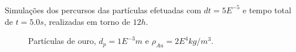 \documentclass{beamer}
\begin{document}
\begin{frame}
  \frametitle{\subsecname}
  \centering
  \begin{minipage}{.48\textwidth}
    \begin{block}{}
    \footnotesize
      Simulações dos percursos das partículas efetuadas com $dt=5E^{-5}$ e tempo total de $t=5.0s$, realizadas em torno de $12h$.
    \end{block}
  \end{minipage}
  \hfill
  \begin{minipage}{.48\textwidth}
    \begin{figure}
       {\raggedleft \tiny Partículas de ouro, $d_p=1E^{-3}m$ e $\rho_{Au}=2E^{4}kg/m^3$.}
    \end{figure}
  \end{minipage}
  

\end{frame}
\end{document}
